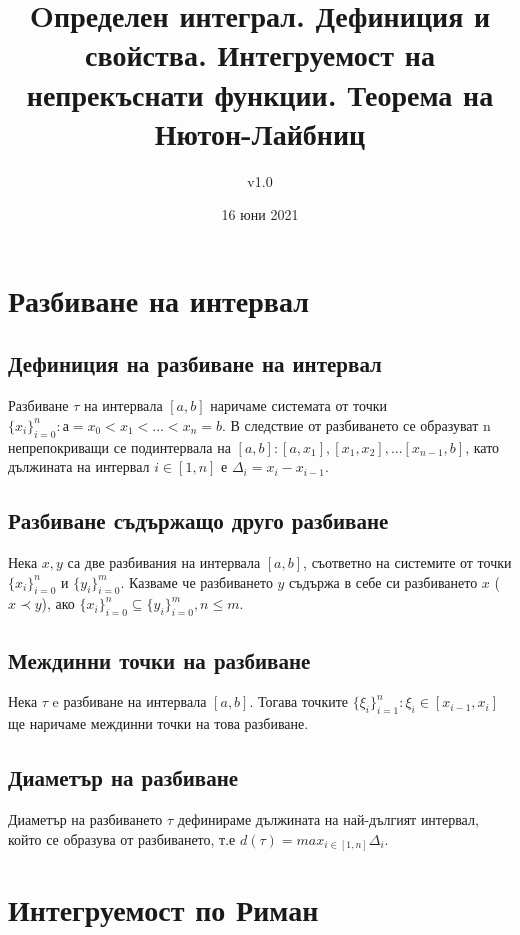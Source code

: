 \documentclass[fleqn,12pt]{article}
\title{Oпределен  интеграл.  Дефиниция  и  свойства.  Интегруемост  на непрекъснати функции. Теорема на Нютон-Лайбниц}
\author{v1.0}
\date{16 юни 2021}
\begin{document}
\maketitle

\tableofcontents
\pagebreak

\begin{flushleft}

\section{Разбиване на интервал}

\subsection{Дефиниция на разбиване на интервал}
Разбиване $\tau$ на интервала $[a,b]$ наричаме системата от точки $\{x_i\}_{i=0}^n : а = x_0 < x_1 < ... < x_n = b$. В следствие от разбиването
се образуват n непрепокриващи се подинтервала на $[a,b] : [a, x_1], [x_1, x_2], ... [x_{n-1}, b]$, като дължината на интервал $i \in [1,n]$ е $\Delta_i = x_i - x_{i-1}$.

\subsection{Разбиване съдържащо друго разбиване}
Нека $x,y$ са две разбивания на интервала $[a,b]$, съответно на системите от точки $\{x_i\}_{i=0}^{n}$ и  $\{y_i\}_{i=0}^{m}$. Казваме че разбиването $y$ съдържа в себе си разбиването $x$ ($x \prec y$), ако
$\{x_i\}_{i=0}^{n} \subseteq  \{y_i\}_{i=0}^{m}, n \leq m$.

\subsection{Междинни точки на разбиване}
Нека $\tau$ e разбиване на интервала $[a,b]$. Тогава точките $\{\xi_i\}_{i=1}^n : \xi_i \in [x_{i-1},x_i]$ ще наричаме междинни точки на това разбиване.

\subsection{Диаметър на разбиване}
Диаметър на разбиването $\tau$ дефинираме дължината на най-дългият интервал, който се образува от разбиването, т.е $d(\tau)=max_{i\in[1,n]} \Delta_i$.

\section{Интегруемост по Риман}

\end{flushleft}
\end{document}
